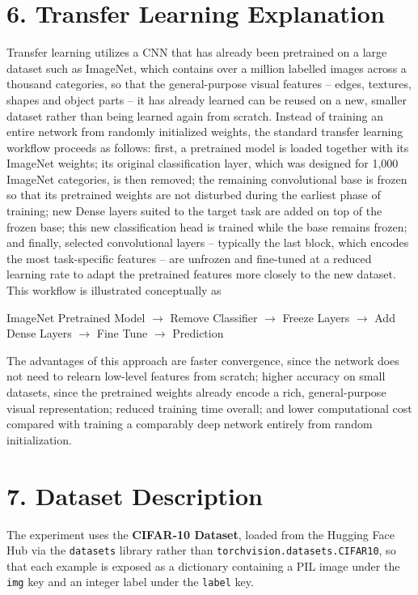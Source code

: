 \documentclass[11pt,a4paper]{article}
\begin{document}
\section*{6. Transfer Learning Explanation}

Transfer learning utilizes a CNN that has already been pretrained on a large dataset such as ImageNet, which contains over a million labelled images across a thousand categories, so that the general-purpose visual features -- edges, textures, shapes and object parts -- it has already learned can be reused on a new, smaller dataset rather than being learned again from scratch. Instead of training an entire network from randomly initialized weights, the standard transfer learning workflow proceeds as follows: first, a pretrained model is loaded together with its ImageNet weights; its original classification layer, which was designed for 1,000 ImageNet categories, is then removed; the remaining convolutional base is frozen so that its pretrained weights are not disturbed during the earliest phase of training; new Dense layers suited to the target task are added on top of the frozen base; this new classification head is trained while the base remains frozen; and finally, selected convolutional layers -- typically the last block, which encodes the most task-specific features -- are unfrozen and fine-tuned at a reduced learning rate to adapt the pretrained features more closely to the new dataset. This workflow is illustrated conceptually as

\begin{center}
ImageNet Pretrained Model $\rightarrow$ Remove Classifier $\rightarrow$ Freeze Layers $\rightarrow$ Add Dense Layers $\rightarrow$ Fine Tune $\rightarrow$ Prediction
\end{center}

The advantages of this approach are faster convergence, since the network does not need to relearn low-level features from scratch; higher accuracy on small datasets, since the pretrained weights already encode a rich, general-purpose visual representation; reduced training time overall; and lower computational cost compared with training a comparably deep network entirely from random initialization.

\section*{7. Dataset Description}

The experiment uses the \textbf{CIFAR-10 Dataset}, loaded from the Hugging Face Hub via the \texttt{datasets} library rather than \texttt{torchvision.datasets.CIFAR10}, so that each example is exposed as a dictionary containing a PIL image under the \texttt{img} key and an integer label under the \texttt{label} key.
\end{document}

